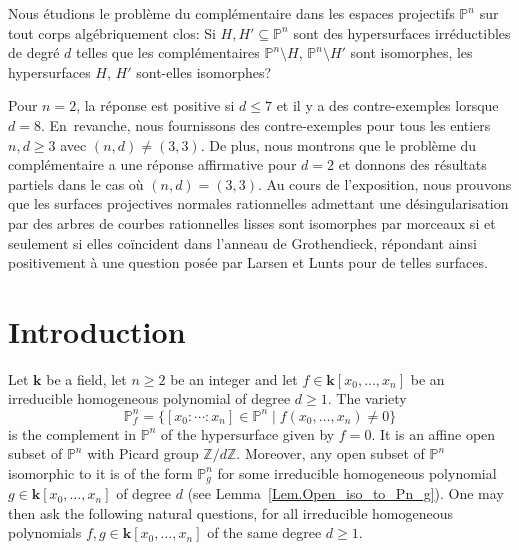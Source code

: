 \documentclass[JEP,XML,SOM,Unicode,NoFloatCountersInSection,published]{cedram}
\theoremstyle{definition}
\renewcommand\k{{\mathbf k}}
\newcommand\p{{\mathbb P}}\let\PP\p
\newcommand\Z{{\mathbb Z}}\let\ZZ\Z
\newcommand{\set}[2]{\{#1 \mid #2\}}
\begin{document}




\begin{altabstract}
Nous étudions le problème du complémentaire dans les espaces projectifs $\mathbb{P}^n$ sur tout corps algébriquement clos: Si $H, H' \subseteq \mathbb{P}^n$ sont des hypersurfaces irréductibles de degré $d$ telles que les complémentaires $\mathbb{P}^n \setminus H$, $\mathbb{P}^n \setminus H'$ sont isomorphes, les hypersurfaces $H$, $H'$ sont-elles isomorphes?

Pour $n = 2$, la réponse est positive si $d\leq 7$ et il y a des contre-exemples lorsque $d = 8$. En~revanche, nous fournissons des contre-exemples pour tous les entiers $n, d \geq 3$ avec $(n, d) \neq (3, 3)$. De plus, nous montrons que le problème du complémentaire a une réponse affirmative pour $d = 2$ et donnons des résultats partiels dans le cas où $(n, d) = (3, 3)$. Au cours de l'exposition, nous prouvons que les surfaces projectives normales rationnelles admettant une désingularisation par des arbres de courbes rationnelles lisses sont isomorphes par morceaux si et seulement si elles coïncident dans l'anneau de Grothendieck, répondant ainsi positivement à une question posée par Larsen et Lunts pour de telles surfaces.
\end{altabstract}

\maketitle
\vspace*{-\baselineskip}
\tableofcontents
\mainmatter

\section{Introduction}

Let $\k$ be a field, let $n\ge 2$ be an integer and let $f\in \k[x_0,\ldots,x_n]$ be an irreducible homogeneous polynomial of degree $d\ge 1$. The variety
\[
\p^n_{f}=\set{[x_0:\cdots:x_n]\in \p^n}{f(x_0,\ldots,x_n)\neq0}
\]
is the complement in $\p^n$ of the hypersurface given by $f=0$. It is an affine open subset of $\p^n$ with Picard group $\Z/d\Z$. Moreover, any open subset of $\p^n$ isomorphic to it is of the form $\p^n_{g}$ for some irreducible homogeneous polynomial $g\in \k[x_0,\ldots,x_n]$ of degree $d$ (see Lemma~\ref{Lem.Open_iso_to_Pn_g}).
One may then ask the following natural questions, for all
irreducible homogeneous polynomials $f,g\in \k[x_0,\ldots,x_n]$ of the same degree $d \geq 1$.
\end{document}
